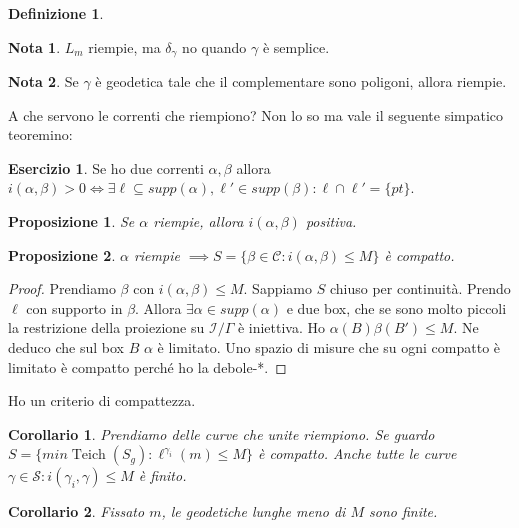 \documentclass[a4paper]{article}
\newtheorem{proposition}{Proposizione}
\newtheorem{corollary}{Corollario}
\theoremstyle{definition}
\newtheorem{definition}{Definizione}
\newtheorem{exercise}{Esercizio}
\newtheorem{remark}{Nota}
\DeclareMathOperator{\Teich}{Teich}
\begin{document}
\begin{definition}
    \begin{remark}
        $L_{m}$ riempie, ma $\delta_\gamma$ no quando $\gamma$ è semplice.
    \end{remark}

    \begin{remark}
        Se $\gamma$ è geodetica tale che il complementare sono poligoni, allora riempie.
    \end{remark}

    A che servono le correnti che riempiono? Non lo so ma vale il seguente simpatico teoremino:
    \begin{exercise}
        Se ho due correnti $\alpha, \beta$ allora $i(\alpha,\beta)>0 \iff \exists \ell \subseteq supp(\alpha), \ell' \in supp(\beta): \ell \cap \ell' =\{pt\}$.
    \end{exercise}

    \begin{proposition}
        Se $\alpha$ riempie, allora $i(\alpha, \beta)$ positiva.
    \end{proposition}

    \begin{proposition}
        $\alpha$ riempie $\implies S = \{\beta \in \mathcal C: i(\alpha,\beta) \leq M\}$ è compatto.
    \end{proposition}

    \begin{proof}
        Prendiamo $\beta$ con $i(\alpha,\beta) \leq M$. Sappiamo $S$ chiuso per continuità. Prendo $\ell$ con supporto in $\beta$. Allora $\exists \alpha \in supp(\alpha)$ e due box, che se sono molto piccoli la restrizione della proiezione su $\mathcal I / \Gamma$ è iniettiva.
        Ho $\alpha(B)\beta(B')\leq M$. Ne deduco che sul box $B$ $\alpha$ è limitato. Uno spazio di misure che su ogni compatto è limitato è compatto perché ho la debole-*.
    \end{proof}

    Ho un criterio di compattezza.
    \begin{corollary}
        Prendiamo delle curve che unite riempiono. Se guardo $S = \{m in \Teich(S_g): \ell^{\gamma_i} (m) \leq M\}$ è compatto.
        Anche tutte le curve $\gamma \in \mathcal S: i(\gamma_i,\gamma) \leq M$ è finito.
    \end{corollary}
    
    \begin{corollary}
        Fissato $m$, le geodetiche lunghe meno di $M$ sono finite.
    \end{corollary}
    
\end{definition}
\end{document}
